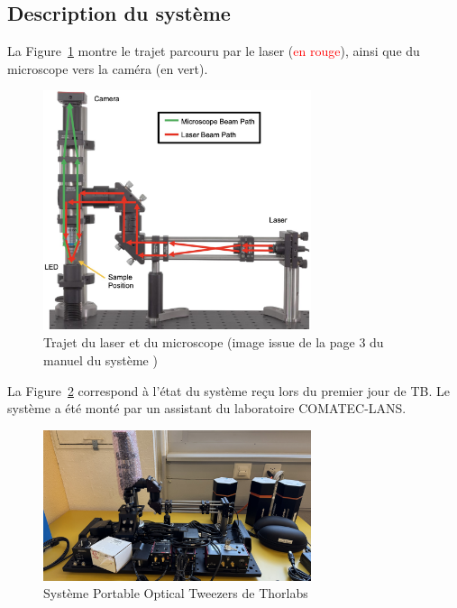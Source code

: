 \newpage
\subsection{Description du système}
La Figure~\ref{chemin_laser_caméra} montre le trajet parcouru par le laser (\textcolor{red}{en rouge}), ainsi que du microscope vers la caméra (\textcolor[RGB]{0, 120, 0}{en vert}).
\begin{figure}[H]
    \begin{center}
        \includegraphics[width=0.7\textwidth]{assets/figures/Introduction/chemin_laser_camera.jpeg}
    \end{center}
    \caption{Trajet du laser et du microscope (image issue de la page 3 du manuel du système \cite{manualPortableOpticalTweezers})}
    \label{chemin_laser_caméra}
\end{figure}

La Figure~\ref{kit_vierge} correspond à l'état du système reçu lors du premier jour de TB. Le système a été monté par un assistant du laboratoire COMATEC-LANS.

\begin{figure}[H]
    \begin{center}
        \includegraphics[width=0.7\textwidth]{assets/figures/Introduction/kit_vierge.jpeg}
    \end{center}
    \caption{Système Portable Optical Tweezers de Thorlabs}
    \label{kit_vierge}
\end{figure}

